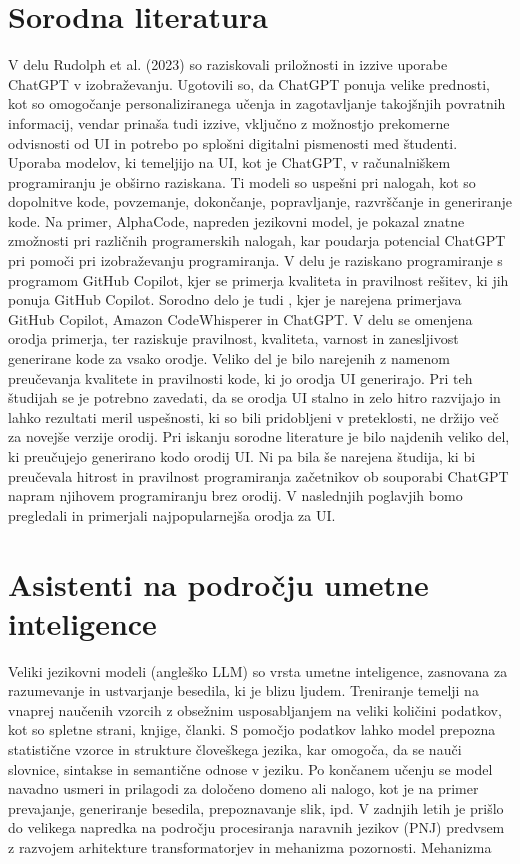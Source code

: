 \documentclass[12pt,a4paper]{book}
\begin{document}
\section{Sorodna literatura}

\cite{app13095783}

V delu Rudolph et al. (2023) so raziskovali priložnosti in izzive uporabe ChatGPT v izobraževanju. Ugotovili so, da ChatGPT ponuja velike prednosti, kot so omogočanje personaliziranega učenja in zagotavljanje takojšnjih povratnih informacij, vendar prinaša tudi izzive, vključno z možnostjo prekomerne odvisnosti od UI in potrebo po splošni digitalni pismenosti med študenti.
Uporaba modelov, ki temeljijo na UI, kot je ChatGPT, v računalniškem programiranju je obširno raziskana. Ti modeli so uspešni pri nalogah, kot so dopolnitve kode, povzemanje, dokončanje, popravljanje, razvrščanje in generiranje kode. Na primer, AlphaCode, napreden jezikovni model, je pokazal znatne zmožnosti pri različnih programerskih nalogah, kar poudarja potencial ChatGPT pri pomoči pri izobraževanju programiranja.
V delu \cite{MORADIDAKHEL2023111734} je raziskano programiranje s programom GitHub Copilot, kjer se primerja kvaliteta in pravilnost rešitev, ki jih ponuja GitHub Copilot.
Sorodno delo je tudi \cite{yetistiren2023evaluating}, kjer je narejena primerjava GitHub Copilot, Amazon CodeWhisperer in ChatGPT. V delu se omenjena orodja primerja, ter raziskuje pravilnost, kvaliteta, varnost in zanesljivost generirane kode za vsako orodje.
Veliko del je bilo narejenih z namenom preučevanja kvalitete in pravilnosti kode, ki jo orodja UI generirajo. Pri teh študijah se je potrebno zavedati, da se orodja UI stalno in zelo hitro razvijajo in lahko rezultati meril uspešnosti, ki so bili pridobljeni v preteklosti, ne držijo več za novejše verzije orodij.
Pri iskanju sorodne literature je bilo najdenih veliko del, ki preučujejo generirano kodo orodij UI. Ni pa bila še narejena študija, ki bi preučevala hitrost in pravilnost programiranja začetnikov ob souporabi ChatGPT napram njihovem programiranju brez orodij. V naslednjih poglavjih bomo pregledali in primerjali najpopularnejša orodja za UI.




\section{Asistenti na področju umetne inteligence}
Veliki jezikovni modeli (angleško LLM) so vrsta umetne inteligence, zasnovana za razumevanje in ustvarjanje besedila, ki je blizu ljudem. Treniranje temelji na vnaprej naučenih vzorcih z obsežnim usposabljanjem na veliki količini podatkov, kot so spletne strani, knjige, članki. S pomočjo podatkov lahko model prepozna statistične vzorce in strukture človeškega jezika, kar omogoča, da se nauči slovnice, sintakse in semantične odnose v jeziku. Po končanem učenju se model navadno usmeri in prilagodi za določeno domeno ali nalogo, kot je na primer prevajanje, generiranje besedila, prepoznavanje slik, ipd.
\cite{10.1145/3520312.3534862}
V zadnjih letih je prišlo do velikega napredka na področju procesiranja naravnih jezikov (PNJ) predvsem z razvojem arhitekture transformatorjev in mehanizma pozornosti. Mehanizma  
\end{document}
